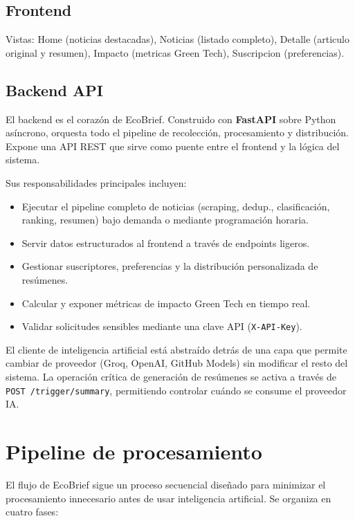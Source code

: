 \documentclass[12pt,oneside]{report}
\begin{document}
\subsection{Frontend}

Vistas: Home (noticias destacadas), Noticias (listado completo), Detalle (articulo original y resumen), Impacto (metricas Green Tech), Suscripcion (preferencias).

\subsection{Backend API}

El backend es el coraz\'on de EcoBrief. Construido con \textbf{FastAPI} sobre Python as\'incrono, orquesta todo el pipeline de recolecci\'on, procesamiento y distribuci\'on. Expone una API REST que sirve como puente entre el frontend y la l\'ogica del sistema.

Sus responsabilidades principales incluyen:

\begin{itemize}[nosep]
    \item Ejecutar el pipeline completo de noticias (scraping, dedup., clasificaci\'on, ranking, resumen) bajo demanda o mediante programaci\'on horaria.
    \item Servir datos estructurados al frontend a trav\'es de endpoints ligeros.
    \item Gestionar suscriptores, preferencias y la distribuci\'on personalizada de res\'umenes.
    \item Calcular y exponer m\'etricas de impacto Green Tech en tiempo real.
    \item Validar solicitudes sensibles mediante una clave API (\texttt{X-API-Key}).
\end{itemize}

El cliente de inteligencia artificial est\'a abstra\'ido detr\'as de una capa que permite cambiar de proveedor (Groq, OpenAI, GitHub Models) sin modificar el resto del sistema. La operaci\'on cr\'itica de generaci\'on de res\'umenes se activa a trav\'es de \texttt{POST /trigger/summary}, permitiendo controlar cu\'ando se consume el proveedor IA.


\section{Pipeline de procesamiento}

El flujo de EcoBrief sigue un proceso secuencial dise\~nado para minimizar el procesamiento innecesario antes de usar inteligencia artificial. Se organiza en cuatro fases:
\end{document}
